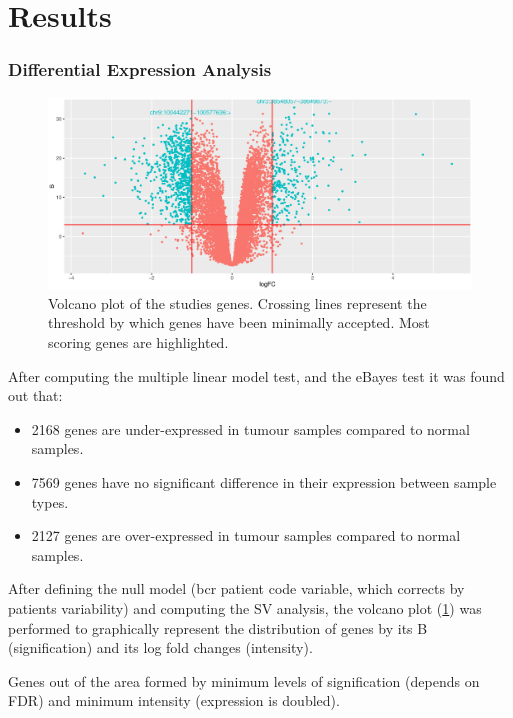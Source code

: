 \documentclass[9pt,twocolumn,twoside]{gsajnl}
\begin{document}
\section*{Results}
\subsubsection*{Differential Expression Analysis}

\begin{figure}[!h]
\centering
\includegraphics[width=\linewidth]{Volcano.eps}
\caption{Volcano plot of the studies genes. Crossing lines represent the threshold by which genes have been minimally accepted. Most scoring genes are highlighted.
}
\label{fig:volcano}
\end{figure}

After computing the multiple linear model test, and the eBayes test \cite{limma} 	it was found out that:

\begin{itemize}
\item 2168 genes are under-expressed in tumour samples compared to normal samples.
\item 7569 genes have no significant difference in their expression between sample types.
\item 2127 genes are over-expressed in tumour samples compared to normal samples.
\end{itemize}

After defining the null model (bcr patient code variable, which corrects by patients variability) and computing the SV analysis, the volcano plot (\ref{fig:volcano}) was performed to graphically represent the distribution of genes by its B (signification) and its log fold changes (intensity).

Genes out of the area formed by minimum levels of signification (depends on FDR) and minimum intensity (expression is doubled).
\end{document}
